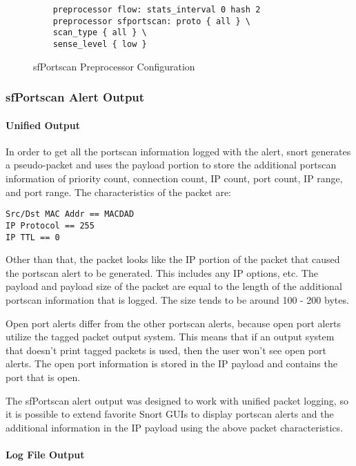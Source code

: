 \documentclass[english]{report}
\begin{document}
\begin{figure}[!hbpt]
\begin{verbatim}
	preprocessor flow: stats_interval 0 hash 2
	preprocessor sfportscan: proto { all } \
    scan_type { all } \
    sense_level { low }
\end{verbatim}
\caption{sfPortscan Preprocessor Configuration \label{sfPortscan Example}}
\end{figure}


\subsubsection{sfPortscan Alert Output\label{sfportscan alert output}}

\paragraph{Unified Output}


In order to get all the portscan information logged with the alert, snort
generates a pseudo-packet and uses the payload portion to store the additional
portscan information of priority count, connection count, IP count, port count,
IP range, and port range.  The characteristics of the packet are:

\begin{verbatim}
Src/Dst MAC Addr == MACDAD
IP Protocol == 255
IP TTL == 0
\end{verbatim}

Other than that, the packet looks like the IP portion of the packet that caused
the portscan alert to be generated.  This includes any IP options, etc.  The
payload and payload size of the packet are equal to the length of the additional
portscan information that is logged.  The size tends to be around 100 - 200
bytes.

Open port alerts differ from the other portscan alerts, because open port alerts
utilize the tagged packet output system.  This means that if an output system
that doesn't print tagged packets is used, then the user won't see open port
alerts.  The open port information is stored in the IP payload and
contains the port that is open.

The sfPortscan alert output was designed to work with unified packet logging, so
it is possible to extend favorite Snort GUIs to display portscan alerts and the
additional information in the IP payload using the above packet characteristics.

\paragraph{Log File Output}
\end{document}
